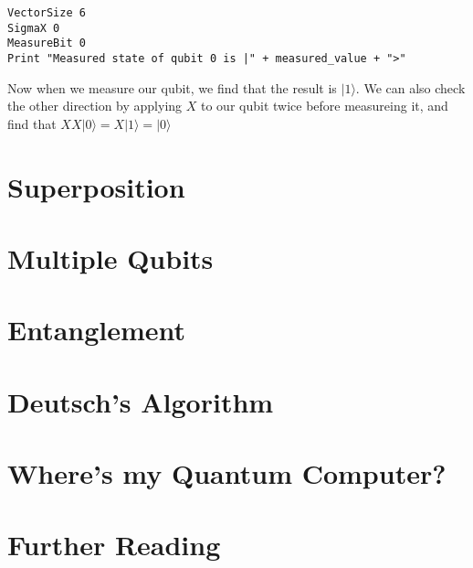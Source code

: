 \documentclass[twocolumn]{article}
\begin{document}
\begin{lstlisting}
VectorSize 6
SigmaX 0
MeasureBit 0
Print "Measured state of qubit 0 is |" + measured_value + ">"
\end{lstlisting}

Now when we measure our qubit, we find that the result is $|1\rangle$. We can also check the other direction by applying $X$ to our qubit twice before measureing it, and find that $XX|0\rangle = X|1\rangle = |0\rangle$

\section{Superposition}

\section{Multiple Qubits}

\section{Entanglement}

\section{Deutsch's Algorithm}

\section{Where's my Quantum Computer?}

\section{Further Reading}
\end{document}
